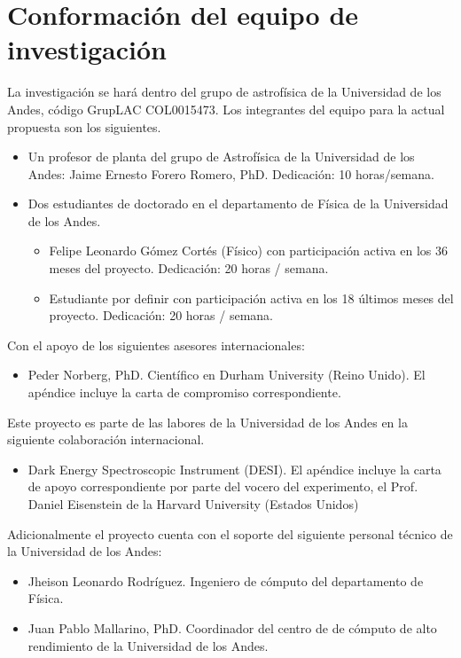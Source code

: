 \section{Conformaci\'on del equipo de investigaci\'on}

La investigaci\'on se har\'a dentro del grupo de astrof\'isica de la
Universidad de los Andes, c\'odigo GrupLAC COL0015473. 
Los integrantes del equipo para la actual propuesta son los
siguientes.  


\begin{itemize}
\item Un profesor de planta del grupo de Astrof\'isica de la
  Universidad de los Andes: Jaime Ernesto  Forero Romero, PhD.
  Dedicaci\'on: 10 horas/semana.
\item Dos estudiantes de doctorado en el departamento de F\'isica de
  la Universidad de los Andes.
\begin{itemize}
\item Felipe Leonardo G\'omez Cort\'es (F\'isico) con participaci\'on
  activa en los 36 meses del proyecto. Dedicaci\'on: 20 horas /
  semana.   
\item Estudiante por definir con participaci\'on activa en los 18 \'ultimos
  meses del proyecto. Dedicaci\'on: 20 horas / semana.  
\end{itemize}
\end{itemize}

\noindent

Con el apoyo de los siguientes asesores internacionales:

\begin{itemize}
\item Peder Norberg, PhD. Cient\'ifico en Durham University (Reino
  Unido). El ap\'endice incluye la carta de compromiso
  correspondiente. 
\end{itemize}

Este proyecto es parte de las labores de la Universidad de los Andes
en la siguiente colaboraci\'on internacional.

\begin{itemize}
\item Dark Energy Spectroscopic Instrument
(DESI). El ap\'endice incluye la carta de apoyo correspondiente por
  parte del vocero del experimento, el Prof. Daniel Eisenstein de la
  Harvard University (Estados Unidos) 
\end{itemize}

\noindent
Adicionalmente el proyecto cuenta con el soporte del siguiente
personal t\'ecnico de la Universidad de los Andes:

\begin{itemize}
\item{Jheison Leonardo Rodr\'iguez. Ingeniero de c\'omputo del
  departamento de F\'isica.} 
\item{Juan Pablo Mallarino, PhD. Coordinador del centro de de
  c\'omputo de alto rendimiento de la Universidad de los Andes.}
\end{itemize}
